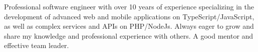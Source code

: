 


\begin{cvparagraph}

Professional software engineer with over 10 years of experience specializing in the development of advanced web and mobile applications on TypeScript/JavaScript, as well as complex services and APIs on PHP/NodeJs.
Always eager to grow and share my knowledge and professional experience with others. A good mentor and effective team leader.
\end{cvparagraph}
\vspace{-2mm}
